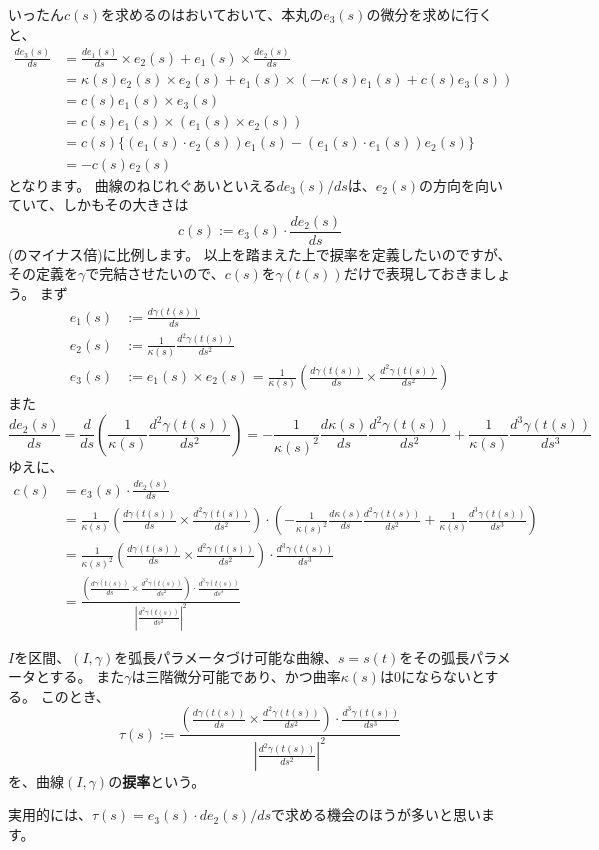 いったん$c(s)$を求めるのはおいておいて、本丸の$e_3(s)$の微分を求めに行くと、
\begin{align*}
  \frac{de_3(s)}{ds}&=\frac{de_1(s)}{ds}\times e_2(s)+e_1(s)\times\frac{de_2(s)}{ds}\\
  &=\kappa(s)e_2(s)\times e_2(s)+e_1(s)\times(-\kappa(s)e_1(s)+c(s)e_3(s))\\
  &=c(s)e_1(s)\times e_3(s)\\
  &=c(s)e_1(s)\times(e_1(s)\times e_2(s))\\
  &=c(s)\{(e_1(s)\cdot e_2(s))e_1(s)-(e_1(s)\cdot e_1(s))e_2(s)\}\\
  &=-c(s)e_2(s)
\end{align*}
となります。
曲線のねじれぐあいといえる$de_3(s)/ds$は、$e_2(s)$の方向を向いていて、しかもその大きさは
\[
  c(s):=e_3(s)\cdot\frac{de_2(s)}{ds}
\]
(のマイナス倍)に比例します。
以上を踏まえた上で捩率を定義したいのですが、その定義を$\gamma$で完結させたいので、$c(s)$を$\gamma(t(s))$だけで表現しておきましょう。
まず
\begin{align*}
  e_1(s)&:=\frac{d\gamma(t(s))}{ds}\\
  e_2(s)&:=\frac{1}{\kappa(s)}\frac{d^2\gamma(t(s))}{ds^2}\\
  e_3(s)&:=e_1(s)\times e_2(s)=\frac{1}{\kappa(s)}\left(\frac{d\gamma(t(s))}{ds}\times\frac{d^2\gamma(t(s))}{ds^2}\right)
\end{align*}
また
\[
  \frac{de_2(s)}{ds}=\frac{d}{ds}\left(\frac{1}{\kappa(s)}\frac{d^2\gamma(t(s))}{ds^2}\right)=-\frac{1}{\kappa(s)^2}\frac{d\kappa(s)}{ds}\frac{d^2\gamma(t(s))}{ds^2}+\frac{1}{\kappa(s)}\frac{d^3\gamma(t(s))}{ds^3}
\]
ゆえに、
\begin{align*}
  c(s)&=e_3(s)\cdot\frac{de_2(s)}{ds}\\
  &=\frac{1}{\kappa(s)}\left(\frac{d\gamma(t(s))}{ds}\times\frac{d^2\gamma(t(s))}{ds^2}\right)\cdot\left(-\frac{1}{\kappa(s)^2}\frac{d\kappa(s)}{ds}\frac{d^2\gamma(t(s))}{ds^2}+\frac{1}{\kappa(s)}\frac{d^3\gamma(t(s))}{ds^3}\right)\\
  &=\frac{1}{\kappa(s)^2}\left(\frac{d\gamma(t(s))}{ds}\times\frac{d^2\gamma(t(s))}{ds^2}\right)\cdot\frac{d^3\gamma(t(s))}{ds^3}\\
  &=\frac{\left(\frac{d\gamma(t(s))}{ds}\times\frac{d^2\gamma(t(s))}{ds^2}\right)\cdot\frac{d^3\gamma(t(s))}{ds^3}}{\left|\frac{d^2\gamma(t(s))}{ds^2}\right|^2}
\end{align*}

\begin{definition}
  $I$を区間、$(I,\gamma)$を弧長パラメータづけ可能な曲線、$s=s(t)$をその弧長パラメータとする。
  また$\gamma$は三階微分可能であり、かつ曲率$\kappa(s)$は0にならないとする。
  このとき、
  \[
    \tau(s):=\frac{\left(\frac{d\gamma(t(s))}{ds}\times\frac{d^2\gamma(t(s))}{ds^2}\right)\cdot\frac{d^3\gamma(t(s))}{ds^3}}{\left|\frac{d^2\gamma(t(s))}{ds^2}\right|^2}
  \]
  を、曲線$(I,\gamma)$の\textbf{捩率}という。
\end{definition}
実用的には、$\tau(s)=e_3(s)\cdot de_2(s)/ds$で求める機会のほうが多いと思います。



